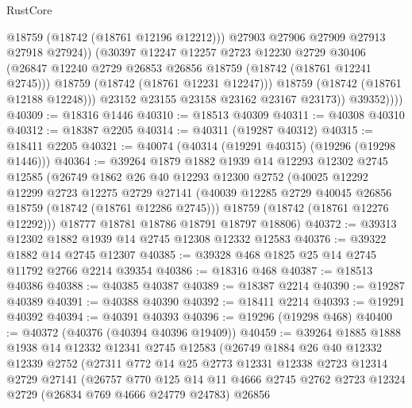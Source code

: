\begin{lexlean}{RustCore}
\begin{coremodule}
                        @18759
                        (@18742 (@18761 @12196 @12212)))
                      @27903
                      @27906
                      @27909
                      @27913
                      @27918
                      @27924))
                  (@30397
                    @12247
                    @12257
                    @2723
                    @12230
                    @2729
                    @30406
                    (@26847 @12240 @2729 @26853 @26856 @18759 (@18742 (@18761 @12241 @2745)))
                    @18759
                    (@18742 (@18761 @12231 @12247)))
                  @18759
                  (@18742 (@18761 @12188 @12248)))
                @23152
                @23155
                @23158
                @23162
                @23167
                @23173))
            @39352))))
@40309 := @18316 @1446
@40310 := @18513 @40309
@40311 := @40308 @40310
@40312 := @18387 @2205
@40314 := @40311 (@19287 @40312)
@40315 := @18411 @2205
@40321 := @40074 (@40314 (@19291 @40315) (@19296 (@19298 @1446)))
@40364 := @39264
    @1879
    @1882
    @1939
    @14
    @12293
    @12302
    @2745
    @12585
    (@26749
      @1862
      @26
      @40
      @12293
      @12300
      @2752
      (@40025
        @12292
        @12299
        @2723
        @12275
        @2729
        @27141
        (@40039 @12285 @2729 @40045 @26856 @18759 (@18742 (@18761 @12286 @2745)))
        @18759
        (@18742 (@18761 @12276 @12292)))
      @18777
      @18781
      @18786
      @18791
      @18797
      @18806)
@40372 := @39313 @12302 @1882 @1939 @14 @2745 @12308 @12332 @12583
@40376 := @39322 @1882 @14 @2745 @12307
@40385 := @39328 @468 @1825 @25 @14 @2745 @11792 @2766 @2214 @39354
@40386 := @18316 @468
@40387 := @18513 @40386
@40388 := @40385 @40387
@40389 := @18387 @2214
@40390 := @19287 @40389
@40391 := @40388 @40390
@40392 := @18411 @2214
@40393 := @19291 @40392
@40394 := @40391 @40393
@40396 := @19296 (@19298 @468)
@40400 := @40372 (@40376 (@40394 @40396 @19409))
@40459 := @39264
    @1885
    @1888
    @1938
    @14
    @12332
    @12341
    @2745
    @12583
    (@26749
      @1884
      @26
      @40
      @12332
      @12339
      @2752
      (@27311
        @772
        @14
        @25
        @2773
        @12331
        @12338
        @2723
        @12314
        @2729
        @27141
        (@26757
          @770
          @125
          @14
          @11
          @4666
          @2745
          @2762
          @2723
          @12324
          @2729
          (@26834 @769 @4666 @24779 @24783)
          @26856

\end{coremodule}
\end{lexlean}
